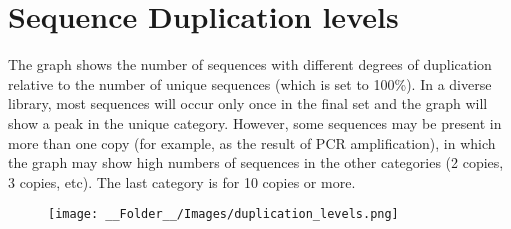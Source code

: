 \documentclass[a4paper, 12pt]{article}
\begin{document}
\newpage
\section{Sequence Duplication levels}
The graph shows the number of sequences with different degrees of duplication relative to the number of unique sequences (which is set to 100\%). In a diverse library, most sequences will occur only once in the final set and the graph will show a peak in the unique category. However, some sequences may be present in more than one copy (for example, as the result of PCR amplification), in which the graph may show high numbers of sequences in the other categories (2 copies, 3 copies, etc). The last category is for 10 copies or more.
 
\begin{figure}[H]
\centering
\texttt{[image: \_\_Folder\_\_/Images/duplication\_levels.png]}
\end{figure}
\end{document}
